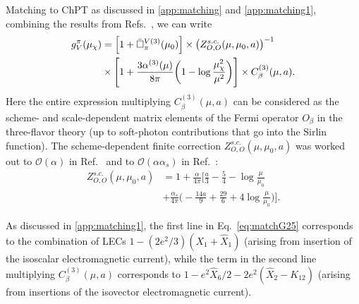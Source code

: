 \documentclass[prl,twocolumn,twoside,preprintnumbers,superscriptaddress,nofootinbib,letterpaper]{revtex4-1}
\newcommand{\Order}{\mathcal{O}}
\begin{document}
Matching to ChPT as discussed in \ref{app:matching} and
 \ref{app:matching1}, combining the results from Refs.~\cite{Cirigliano:2023fnz,Gorbahn:2025ssv},
we can write
\begin{align}
\label{eq:matchG25}
g_V^\pi (\mu_\chi) &=
\Big[ 1+\bar\Box^{V(3)}_\pi(\mu_0) \Big]
\times
\left( Z_{O,O}^{s.c.} (\mu, \mu_0, a) \right)^{-1}
 \\
& \times
\Bigg[ 1 + \frac{3 \alpha^{(3)} (\mu)}{8 \pi}    \bigg( 1 - \log \frac{\mu_\chi^2}{\mu^2} \bigg)  \Bigg]
\times C^{(3)}_\beta (\mu, a).
\notag
\end{align}
Here  the entire expression multiplying $C^{(3)}_\beta (\mu, a)$
can be considered as the scheme- and scale-dependent  matrix elements of the Fermi operator $O_\beta$
in the three-flavor theory
(up to soft-photon contributions that go into the Sirlin function).
The scheme-dependent finite correction $ Z_{O,O}^{s.c.} (\mu, \mu_0, a)$
was worked out to $\Order (\alpha)$ in
Ref.~\cite{Cirigliano:2023fnz}
and to $\Order (\alpha \alpha_s)$    in Ref.~\cite{Gorbahn:2025ssv}:
\begin{align}
 Z_{O,O}^{s.c.} (\mu, \mu_0, a) &=  1 + \frac{\alpha}{4 \pi} \Bigg[
 \frac{a}{3} - \frac{5}{4} - \log \frac{\mu}{\mu_0}
  \nonumber \\
&+ \frac{\alpha_s}{4 \pi} \bigg( - \frac{14 a}{9}  + \frac{29}{6} + 4  \log \frac{\mu}{\mu_0} \bigg)
\Bigg].
\end{align}

As discussed in \ref{app:matching1}, the first line in Eq.~\eqref{eq:matchG25} corresponds to the combination
of LECs $1 -(2 e^2/3) (X_1 +  \hat X_1)$ (arising from insertion of the isoscalar electromagnetic current), while the term in the second line multiplying $C^{(3)}_\beta (\mu, a)$
corresponds to $1 - e^2 \hat X_6/2 -2 e^2 (\hat X_2 - K_{12})$ (arising from insertions of the isovector electromagnetic current).
\end{document}
